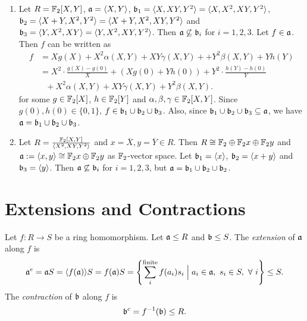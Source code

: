 \begin{example}
    \begin{enumerate}
        \item Let $R = \mathbb{F}_2[X,Y]$, $\mathfrak{a} = \langle X,Y \rangle$, $\mathfrak{b}_1 = \langle X,XY,Y^2 \rangle = \langle X,X^2,XY,Y^2 \rangle$, $\mathfrak{b}_2 = \langle X+Y,X^2,Y^2 \rangle = \langle X+Y,X^2,XY,Y^2 \rangle$ and $\mathfrak{b}_3 = \langle Y,X^2,XY \rangle = \langle Y,X^2,XY,Y^2 \rangle$. Then $\mathfrak{a} \not \subseteq \mathfrak{b}_i$ for $i = 1,2,3$. Let $f \in \mathfrak{a}$. Then $f$ can be written as 
            \begin{align*}
                f &= X g(X) + X^2\alpha(X,Y) + XY\gamma(X,Y) + +Y^2\beta(X,Y) + Yh(Y) \\
                  &= X^2 \cdot \frac{g(X)-g(0)}{X} + (Xg(0)+Yh(0)) + Y^2 \cdot \frac{h(Y)-h(0)}{Y} \\
                  &\ \ \ + X^2\alpha(X,Y) + XY\gamma(X,Y) + Y^2\beta(X,Y).
            \end{align*}
            for some $g \in \mathbb{F}_2[X]$, $h \in \mathbb{F}_2[Y]$ and $\alpha,\beta,\gamma \in \mathbb{F}_2[X,Y]$. Since $g(0), h(0) \in \{0,1\}$, $f \in \mathfrak{b}_1 \cup \mathfrak{b}_2 \cup \mathfrak{b}_3$. Also, since $\mathfrak{b}_1 \cup \mathfrak{b}_2 \cup \mathfrak{b}_3 \subseteq \mathfrak{a}$, we have $\mathfrak{a} = \mathfrak{b}_1 \cup \mathfrak{b}_2 \cup \mathfrak{b}_3$.
        \item Let $R = \frac{\mathbb{F}_2[X,Y]}{\langle X^2,XY,Y^2 \rangle}$ and $x = \overbar{X}, y = \overbar{Y} \in R$. Then $R \cong \mathbb{F}_2 \oplus \mathbb{F}_2x \oplus \mathbb{F}_2y$ and $\mathfrak{a} := \langle x,y \rangle \cong \mathbb{F}_2x \oplus \mathbb{F}_2y$ as $\mathbb{F}_2$-vector space. Let $\mathfrak{b}_1 = \langle x \rangle$, $\mathfrak{b}_2 = \langle x + y \rangle$ and $\mathfrak{b}_3 = \langle y \rangle$. Then $\mathfrak{a} \not \subseteq \mathfrak{b}_i$ for $i = 1,2,3$, but $\mathfrak{a} = \mathfrak{b}_1 \cup \mathfrak{b}_2 \cup \mathfrak{b}_2$.
    \end{enumerate}
\end{example}

\section*{Extensions and Contractions}

\begin{definition}
    Let $f: R \to S$ be a ring homomorphism. Let $\mathfrak{a} \leq R$ and $\mathfrak{b} \leq S$. The \emph{extension} of $\mathfrak{a}$ along $f$ is 
    \[\mathfrak{a}^e = \mathfrak{a} S = \langle f(\mathfrak{a}) \rangle S  = f(\mathfrak{a})S = \left\{\sum_i^{\text{finite}} f(a_i)s_i \mathrel{\Big |} a_i \in \mathfrak{a},\ s_i \in S, \ \forall \  i \right\} \leq S.\]
    The \emph{contraction} of $\mathfrak{b}$ along $f$ is 
    \[\mathfrak{b}^c = f^{-1}(\mathfrak{b}) \leq R.\]
\end{definition}

